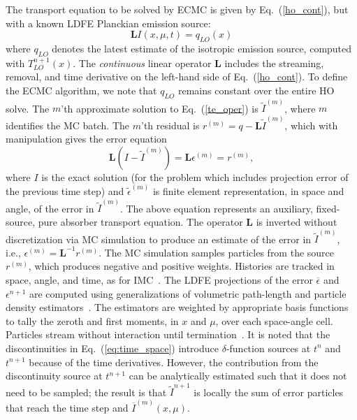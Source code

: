 \documentclass{anstrans}
\renewcommand{\eqref}[1]{(\ref{#1})}
\newcommand{\B}[1]{\ensuremath{\mathbf{#1}}}
\begin{document}
The transport equation to be solved by ECMC is given by Eq.~\eqref{ho_cont}, but with a
known LDFE Planckian emission source:
\begin{equation}\label{te_oper}
    \B L I(x,\mu,t)  = q_{LO}(x)
\end{equation}
where $q_{LO}$ denotes the latest estimate of the isotropic emission source, computed with $T_{LO}^{n+1}(x)$.  The \emph{continuous} linear operator $\B L$ includes the streaming, removal, and
time derivative on the left-hand side of Eq.~\eqref{ho_cont}.  
To define the ECMC algorithm, we note that $q_{LO}$ remains constant over the entire HO solve.
The $m$'th approximate solution to Eq.~\eqref{te_oper} is $\tilde{I}^{(m)}$, where
$m$ identifies the MC batch.
The $m$'th residual is $r^{(m)} = q - \B L\tilde{I}^{(m)}$, which with manipulation gives the error equation
\begin{equation}
\B L (I - \tilde{I}^{(m)}) = \B L {\epsilon}^{(m)} = r^{(m)},
\end{equation}
where $I$ is the exact solution (for the problem which includes projection error of the
previous time step) and $\tilde{\epsilon}^{(m)}$ is finite element
representation, in space and angle, of the error in
$\tilde{I}^{(m)}$. The above equation represents an auxiliary, fixed-source, pure
absorber transport equation.
The operator $\B L$ is inverted without discretization via MC simulation to produce an
estimate of the error in $\tilde{I}^{(m)}$, i.e., ${\epsilon}^{(m)} = \B
L^{-1} r^{(m)}$.  The MC simulation samples particles from the source $r^{(m)}$, which
produces negative and positive weights.  Histories are tracked in space, angle, and time, as for IMC~\cite{wollaber_review}.
The LDFE projections of the error $\overline{\epsilon}$ and $\epsilon^{n+1}$ are computed using
generalizations of volumetric path-length and particle density
estimators~\cite{wollaber_review}.  The estimators are weighted by appropriate basis
functions to tally the zeroth and first moments, in $x$ and $\mu$, over each
space-angle cell.  Particles stream without interaction until termination~\cite{bolding_nse}.
It is noted that the discontinuities in Eq.~\eqref{eq:time_space} introduce $\delta$-function sources at $t^{n}$ and $t^{n+1}$
because of the time derivatives.
However, the contribution from the discontinuity source at $t^{n+1}$ can be analytically
estimated such that it does not need to be sampled; the result is that $\tilde I^{n+1}$ is locally the sum of
error particles that reach the time step and $\overline I^{(m)}(x,\mu)$.  
\end{document}
